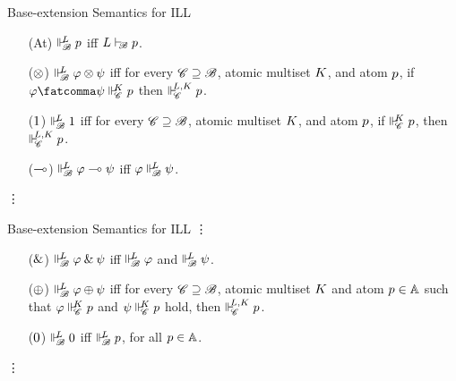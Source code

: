 \documentclass{beamer}
\begin{document}
\begin{frame}{Base-extension Semantics for ILL}
\begin{center}
\begin{itemize}
\item[(At)] $\Vdash_{ \!\!\mathscr{B} }^{ \!\!{L} } {p}$ iff ${L} \vdash_{\!\!\mathscr{B}} {p}$. 
\item[($\otimes$)] $\Vdash_{ \!\!\mathscr{B} }^{ \!\!{L} } \varphi \otimes \psi$ iff for every $\mathscr{C} \supseteq \mathscr{B}$, atomic multiset ${K}$, and atom ${p}$, if $\varphi\fatcomma\psi\suppM{\baseC}{\at{K}} \at{p}$ then $\Vdash_{ \!\!\mathscr{C} }^{ \!\!{L},{K} } {p}$. 
\item[($1$)] $\Vdash_{ \!\!\mathscr{B} }^{ \!\!{L} } 1$ iff for every $\mathscr{C} \supseteq \mathscr{B}$, atomic multiset ${K}$, and atom ${p}$, if $\Vdash_{ \!\!\mathscr{C} }^{ \!\!{K} } {p}$, then $\Vdash_{ \!\!\mathscr{C} }^{ \!\!{L},{K} } {p}$. 
\item[($\multimap$)] $\Vdash_{ \!\!\mathscr{B} }^{ \!\!{L} } \varphi \multimap \psi$ iff $\varphi \Vdash_{ \!\!\mathscr{B} }^{ \!\!{L} } \psi$. 
\end{itemize}
\end{center}
\hspace{0.5\textwidth}\vdots
\end{frame}
\begin{frame}{Base-extension Semantics for ILL}
	\hspace{0.5\textwidth}\vdots
	\begin{center}
	\begin{itemize}
        \item[($\mathbin{\&}$)] $\Vdash_{ \!\!\mathscr{B} }^{ \!\!L } \varphi \mathbin{\&} \psi$ iff $\Vdash_{ \!\!\mathscr{B} }^{ \!\!L } \varphi$ and $\Vdash_{ \!\!\mathscr{B} }^{ \!\!L } \psi$. 
        \item[($\oplus$)] 
        $\Vdash_{ \!\!\mathscr{B} }^{ \!\!L } \varphi \oplus \psi$ iff for every $\mathscr{C} \supseteq \mathscr{B}$, atomic multiset ${K}$ and atom $p \in \mathbb{A}$ such that $\varphi \Vdash_{ \!\!\mathscr{C} }^{ \!\!{K} } {p}$ and $\psi \Vdash_{ \!\!\mathscr{C} }^{ \!\!{K} } {p}$ hold, then $\Vdash_{ \!\!\mathscr{C} }^{ \!\!{L},{K} } {p}$. 
        \item[($0$)] $\Vdash_{ \!\!\mathscr{B} }^{ \!\!{L} } 0$ iff $\Vdash_{ \!\!\mathscr{B} }^{ \!\!{L} } {p}$, for all ${p} \in \mathbb{A}$.
	\end{itemize}
	\end{center}
	\hspace{0.5\textwidth}\vdots
	\end{frame}
\end{document}
